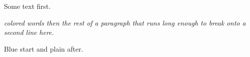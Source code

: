 \documentclass{article}
\begin{document}
Some text first.

{\small\itshape {\color{red!30!black} colored words} then the rest of a paragraph that runs long enough to break onto a second line here.\par}
\medskip
{\color{blue} Blue start} and plain after.
\end{document}
